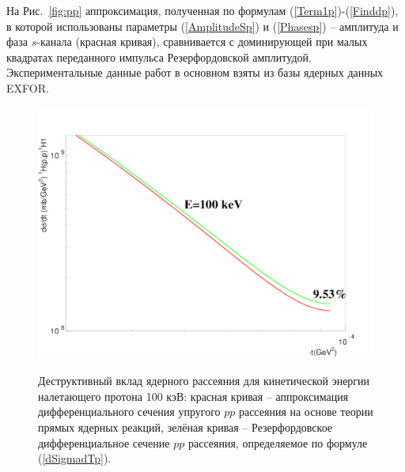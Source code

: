 \documentclass[a4paper,12pt]{article}
\begin{document}
\begin{large}
  На Рис.~\ref{fig:pp} аппроксимация, полученная по формулам (\ref{Term1p})-(\ref{Finddp}), в которой использованы параметры (\ref{AmplitudeSp}) и (\ref{Phasesp}) -- амплитуда и фаза $s$-канала (красная кривая), сравнивается с доминирующей при малых квадратах переданного импульса Резерфордовской амплитудой.
  Экспериментальные данные работ \cite{PP1_Wassmer,PP2_Worthigton,PP3_Blair,PP4_Imai,PP5_Johnston,PP6_Kikuchi,PP7_Berdoz,
 PP8_Taylor,PP9_Mahjour} в основном взяты из базы ядерных данных EXFOR.


\begin{figure}[ht]
  {
       \includegraphics[width=0.99\linewidth]{images/pp100kev}
  }
  \caption{Деструктивный вклад ядерного рассеяния для кинетической энергии налетающего протона 100 кэВ: красная кривая -- аппроксимация дифференциального сечения упругого $pp$ рассеяния на основе теории прямых ядерных реакций, зелёная кривая -- Резерфордовское дифференциальное сечение $pp$ рассеяния, определяемое по формуле (\ref{dSigmadTp}).}
  \label{fig:pp100kev}
\end{figure}


\end{large}
\end{document}
